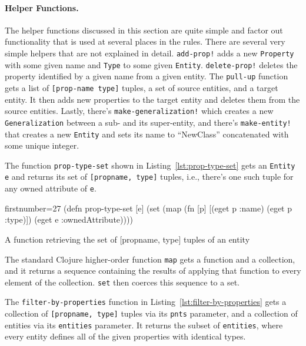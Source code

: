 \documentclass[submission]{eptcs}
\begin{document}
\paragraph{Helper Functions.}

The helper functions discussed in this section are quite simple and factor out
functionality that is used at several places in the rules.  There are several
very simple helpers that are not explained in detail.  \verb|add-prop!| adds a
new \verb|Property| with some given name and \verb|Type| to some given
\verb|Entity|.  \verb|delete-prop!| deletes the property identified by a given
name from a given entity.  The \verb|pull-up| function gets a list of
\verb|[prop-name type]| tuples, a set of source entities, and a target entity.
It then adds new properties to the target entity and deletes them from the
source entities.  Lastly, there's \verb|make-generalization!| which creates a
new \verb|Generalization| between a sub- and its super-entity, and there's
\verb|make-entity!| that creates a new \verb|Entity| and sets its name to
``NewClass'' concatenated with some unique integer.

The function \verb|prop-type-set| shown in Listing~\ref{lst:prop-type-set} gets
an \verb|Entity e| and returns its set of \verb|[propname, type]| tuples, i.e.,
there's one such tuple for any owned attribute of \verb|e|.

\begin{listing}[h!tbp]
  \begin{clojurecode*}{firstnumber=27}
(defn prop-type-set [e]
  (set (map (fn [p] [(eget p :name) (eget p :type)])
            (eget e :ownedAttribute))))
  \end{clojurecode*}
  \caption{A function retrieving the set of \textsf{[propname, type]} tuples of
    an entity}
    \label{lst:prop-type-set}
\end{listing}

The standard Clojure higher-order function \verb|map| gets a function and a
collection, and it returns a sequence containing the results of applying that
function to every element of the collection.  \verb|set| then coerces this
sequence to a set.


The \verb|filter-by-properties| function in
Listing~\ref{lst:filter-by-properties} gets a collection of
\verb|[propname, type]| tuples via its \verb|pnts| parameter, and a collection
of entities via its \verb|entities| parameter.  It returns the subset of
\verb|entities|, where every entity defines all of the given properties with
identical types.
\end{document}
